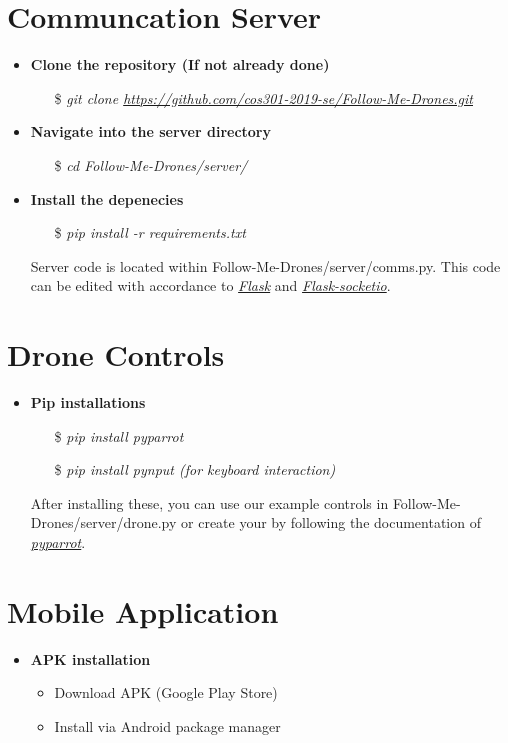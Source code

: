 \section{Communcation Server}
\begin{itemize}
    \item \textbf{Clone the repository (If not already done)}
        \begin{itemize}
            \item[\$] \textit{git clone \url{https://github.com/cos301-2019-se/Follow-Me-Drones.git}}
        \end{itemize}
    \item \textbf{Navigate into the server directory}
        \begin{itemize}
            \item[\$] \textit{cd Follow-Me-Drones/server/}
        \end{itemize}
    \item \textbf{Install the depenecies}
        \begin{itemize}
            \item[\$] \textit{pip install -r requirements.txt}
        \end{itemize}

        Server code is located within Follow-Me-Drones/server/comms.py. This code can be edited with accordance to \href{https://pypi.org/project/Flask/}{\textit{Flask}} and \href{https://flask-socketio.readthedocs.io/en/latest/}{\textit{Flask-socketio}}.
\end{itemize}


\section{Drone Controls}

\begin{itemize}
    \item \textbf{Pip installations}
        \begin{itemize}
            \item[\$] \textit{pip install pyparrot}
            \item[\$] \textit{pip install pynput (for keyboard interaction)} 
        \end{itemize}
        After installing these, you can use our example controls in Follow-Me-Drones/server/drone.py or create your by following the documentation of \href{https://pyparrot.readthedocs.io/en/latest/}{\textit{pyparrot}}.
\end{itemize}

\section{Mobile Application}

\begin{itemize}
	\item \textbf{APK installation}
        \begin{itemize}
			\item  Download APK (Google Play Store) 
			\item  Install via Android package manager 
        \end{itemize}
\end{itemize}
